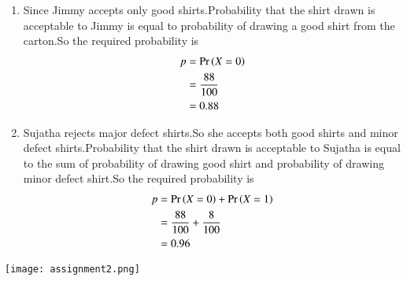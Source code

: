 \documentclass[journal,12pt,twocolumn]{IEEEtran}
\begin{document}
\begin{enumerate}[label={\roman*)}]
    \item Since Jimmy accepts only good shirts.Probability that the shirt drawn is acceptable to Jimmy is equal to probability of drawing a good shirt from the carton.So the required probability is\\
    \begin{align}
      p &= \Pr\left(X=0\right)\\
        &= \frac{88}{100}\\
        &= 0.88
    \end{align}
    \item Sujatha rejects major defect shirts.So she accepts both good shirts and minor defect shirts.Probability that the shirt drawn is acceptable to Sujatha is equal to the sum of probability of drawing good shirt and probability of drawing minor defect shirt.So the required probability is
    \begin{align}
        p &= \Pr\left(X=0\right)+\Pr\left(X=1\right)\\
          &= \frac{88}{100}+\frac{8}{100}\\
          &=0.96
    \end{align}
\end{enumerate}
\centering
\texttt{[image: assignment2.png]}
\end{document}
